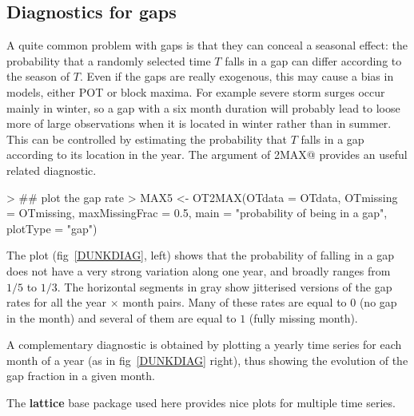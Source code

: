\documentclass[a4paper]{report}
\newcommand{\pkg}[1]{\textbf{#1}}
\begin{document}
\subsection{Diagnostics for gaps}
\label{DiagGaps}
A quite common problem with gaps is that they can conceal a seasonal
effect: the probability that a randomly selected time $T$ falls in a
gap can differ according to the season of $T$. Even if the gaps are
really exogenous, this may cause a bias in models, either POT or block
maxima. For example severe storm surges occur mainly in winter, so a
gap with a six month duration will probably lead to loose more of
large observations when it is located in winter rather than in
summer. This can be controlled by estimating the probability that $T$
falls in a gap according to its location in the year. The
\verb@plotType@ argument of \verb@OT2MAX@ provides an useful related
diagnostic.

\begin{Schunk}
\begin{Sinput}
>  ## plot the gap rate
> MAX5 <- OT2MAX(OTdata = OTdata, OTmissing = OTmissing,
                  maxMissingFrac = 0.5,
                  main = "probability of being in a  gap",
                  plotType = "gap")
\end{Sinput}
\end{Schunk}

\noindent
The plot (fig~\ref{DUNKDIAG}, left) shows that the probability of falling
in a gap does not have a very strong variation along one year, and
broadly ranges from $1/5$ to $1/3$. The horizontal segments in gray
show jitterised versions of the gap rates for all the year $\times$
month pairs. Many of these rates are equal to $0$ (no gap in the month) and
several of them are equal to $1$ (fully missing month).

A complementary diagnostic is obtained by plotting a yearly time
series for each month of a year (as in fig~\ref{DUNKDIAG} right), thus
showing the evolution of the gap fraction in a given month.

\begin{Schunk}
\end{Schunk}

\noindent
The \pkg{lattice} base package \citep{PACKlattice} used here
provides nice plots for multiple time series.
\end{document}
